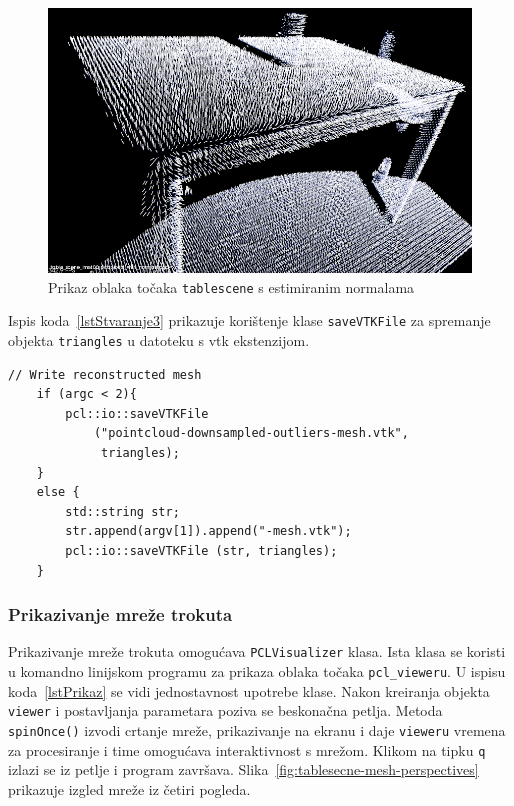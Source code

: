
\begin{figure}[h]
\centering
\includegraphics[scale=0.4]{figures/tablescene-normals.png}
\caption{Prikaz oblaka točaka \texttt{tablescene} s estimiranim
normalama }
\label{fig:tablescene-normals}
\end{figure}

Ispis koda~\ref{lstStvaranje3} prikazuje korištenje klase
\texttt{saveVTKFile} za spremanje objekta \texttt{triangles} u datoteku
s vtk ekstenzijom.

\begin{lstlisting}[label=lstStvaranje3,caption={Dio izvornog koda za
    zapisivanju mreže iz funkcije \texttt{reconstruct\_mesh()} }]
    // Write reconstructed mesh
    if (argc < 2){
        pcl::io::saveVTKFile
            ("pointcloud-downsampled-outliers-mesh.vtk",
             triangles);
    }
    else {
        std::string str;
        str.append(argv[1]).append("-mesh.vtk");
        pcl::io::saveVTKFile (str, triangles);
    }
\end{lstlisting}


\newpage
\subsubsection{Prikazivanje mreže trokuta} %
\label{ssub:Prikazivanje mreže trokuta}
Prikazivanje mreže trokuta omogućava \texttt{PCLVisualizer} klasa. Ista
klasa se koristi u komandno linijskom programu za prikaza oblaka točaka
\texttt{pcl\_vieweru}. U ispisu koda~\ref{lstPrikaz} se vidi
jednostavnost upotrebe klase. Nakon kreiranja objekta \texttt{viewer} i
postavljanja parametara poziva se beskonačna petlja. Metoda
\texttt{spinOnce()} izvodi crtanje mreže, prikazivanje na ekranu i
daje \texttt{vieweru} vremena za procesiranje i time omogućava
interaktivnost s mrežom. Klikom na tipku \texttt{q} izlazi se iz petlje
i program završava. Slika~\ref{fig:tablesecne-mesh-perspectives}
prikazuje izgled mreže iz četiri pogleda.

